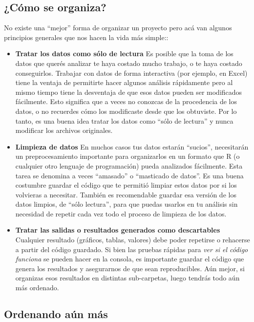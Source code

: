\documentclass[
  openany]{book}
\providecommand{\tightlist}{%
  \setlength{\itemsep}{0pt}\setlength{\parskip}{0pt}}
\begin{document}
\hypertarget{cuxf3mo-se-organiza}{%
\subsection{¿Cómo se organiza?}\label{cuxf3mo-se-organiza}}

No existe una ``mejor'' forma de organizar un proyecto pero acá van algunos principios generales que nos hacen la vida más simple::

\begin{itemize}
\tightlist
\item
  \textbf{Tratar los datos como sólo de lectura} Es posible que la toma de los datos que querés analizar te haya costado mucho trabajo, o te haya costado conseguirlos. Trabajar con datos de forma interactiva (por ejemplo, en Excel) tiene la ventaja de permitirte hacer algunos análisis rápidamente pero al mismo tiempo tiene la desventaja de que esos datos pueden ser modificados fácilmente. Esto significa que a veces no conozcas de la procedencia de los datos, o no recuerdes cómo los modificaste desde que los obtuviste. Por lo tanto, es una buena idea tratar los datos como ``sólo de lectura'' y nunca modificar los archivos originales.
\item
  \textbf{Limpieza de datos} En muchos casos tus datos estarán ``sucios'', necesitarán un preprocesamiento importante para organizarlos en un formato que R (o cualquier otro lenguaje de programación) pueda analizados fácilmente. Esta tarea se denomina a veces ``amasado'' o ``masticado de datos''. Es una buena costumbre guardar el código que te permitió limpiar estos datos por si los volvieras a necesitar. También es recomendable guardar esa versión de los datos limpios, de ``sólo lectura'', para que puedas usarlos en tu análisis sin necesidad de repetir cada vez todo el proceso de limpieza de los datos.
\item
  \textbf{Tratar las salidas o resultados generados como descartables} Cualquier resultado (gráficos, tablas, valores) debe poder repetirse o rehacerse a partir del código guardado. Si bien las pruebas rápidas para \emph{ver si el código funciona} se pueden hacer en la consola, es importante guardar el código que genera los resultados y asegurarnos de que sean reproducibles. Aún mejor, si organizas esos resultados en distintas sub-carpetas, luego tendrás todo aún más ordenado.
\end{itemize}

\hypertarget{ordenando-auxfan-muxe1s}{%
\subsection{Ordenando aún más}\label{ordenando-auxfan-muxe1s}}
\end{document}
